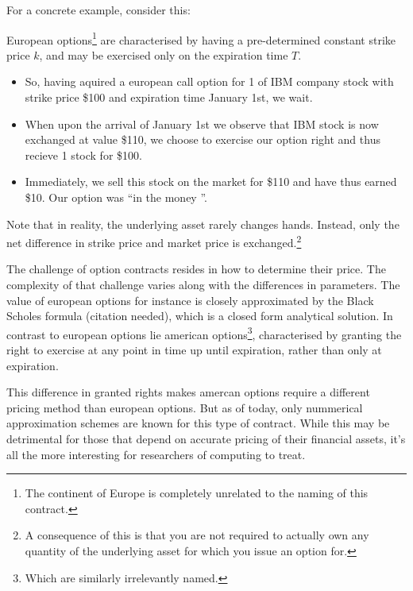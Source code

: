 For a concrete example, consider this:
\begin{example}

  European options\footnote{The continent of Europe is completely unrelated to
  the naming of this contract.} are characterised by having a pre-determined
  constant strike price $k$, and may be exercised only on the expiration time
  $T$.

  \begin{itemize}

    \item So, having aquired a european call option for 1 of IBM company stock
      with strike price \$100 and expiration time January 1st, we wait.

    \item When upon the arrival of January 1st we observe that IBM stock is now
      exchanged at value \$110, we choose to exercise our option right and thus
      recieve 1 stock for \$100.

    \item Immediately, we sell this stock on the market for \$110 and have thus
      earned \$10. Our option was ``in the money ''.

  \end{itemize}

  Note that in reality, the underlying asset rarely changes hands. Instead,
  only the net difference in strike price and market price is
  exchanged.\footnote{A consequence of this is that you are not required to
  actually own any quantity of the underlying asset for which you issue an
  option for.}

\end{example}

The challenge of option contracts resides in how to determine their price. The
complexity of that challenge varies along with the differences in parameters.
The value of european options for instance is closely approximated by the Black
Scholes formula (citation needed), which is a closed form analytical solution.
In contrast to european options lie american options\footnote{Which are
similarly irrelevantly named.}, characterised by granting the right to exercise
at any point in time up until expiration, rather than only at expiration.

This difference in granted rights makes amercan options require a different
pricing method than european options. But as of today, only nummerical
approximation schemes are known for this type of contract. While this may be
detrimental for those that depend on accurate pricing of their financial
assets, it's all the more interesting for researchers of computing to treat.

